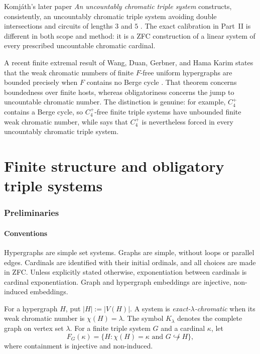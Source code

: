 \documentclass[11pt]{amsart}
\theoremstyle{definition}
\theoremstyle{remark}
\numberwithin{equation}{section}
\begin{document}
Komj\'ath's later paper \emph{An uncountably chromatic triple system}
constructs, consistently, an uncountably chromatic triple system avoiding
double intersections and circuits of lengths $3$ and $5$
\cite{Komjath2008}.  The exact calibration in Part~II is different in
both scope and method: it is a ZFC construction of a linear system of
every prescribed uncountable chromatic cardinal.

A recent finite extremal result of Wang, Duan, Gerbner, and Hama Karim
states that the weak chromatic numbers of finite $F$-free uniform
hypergraphs are bounded precisely when $F$ contains no Berge cycle
\cite[Proposition~1.3(ii)]{WangDuanGerbnerKarim}.  That theorem concerns
boundedness over finite hosts, whereas obligatoriness concerns the jump
to uncountable chromatic number.  The distinction is genuine: for
example, $C_4^+$ contains a Berge cycle, so $C_4^+$-free finite triple
systems have unbounded finite weak chromatic number, while
 says that $C_4^+$ is nevertheless forced
in every uncountably chromatic triple system.

\part{Finite structure and obligatory triple systems}

\section{Preliminaries}
\label{sec:preliminaries}

\subsection{Conventions}

Hypergraphs are simple set systems.  Graphs are simple, without loops or
parallel edges.  Cardinals are identified with their initial ordinals,
and all choices are made in ZFC.  Unless explicitly stated otherwise,
exponentiation between cardinals is cardinal exponentiation.  Graph and
hypergraph embeddings are injective, non-induced embeddings.

For a hypergraph $H$, put $|H|:=|V(H)|$.  A system is
\emph{exact-$\lambda$-chromatic} when its weak chromatic number is
$\chi(H)=\lambda$.  The symbol $K_\lambda$ denotes the complete graph on
vertex set $\lambda$.  For a finite triple system $G$ and a cardinal
$\kappa$, let
\[
 F_G(\kappa)=\{H:\chi(H)=\kappa\text{ and }G\not\hookrightarrow H\},
\]
where containment is injective and non-induced.
\end{document}
